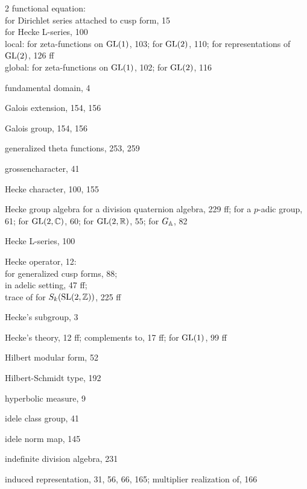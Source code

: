 \begin{multicols}{2}
\noindent functional equation:\\
\hspace*{1em}for Dirichlet series attached to cusp form, 15\\
\hspace*{1em}for Hecke L-series, 100\\
\hspace*{1em}local: for zeta-functions on $\operatorname{GL}(1)$, 103; for $\operatorname{GL}(2)$, 110; for representations of $\operatorname{GL}(2)$, 126 ff\\
\hspace*{1em}global: for zeta-functions on $\operatorname{GL}(1)$, 102; for $\operatorname{GL}(2)$, 116\par
\noindent fundamental domain, 4\par
\noindent Galois extension, 154, 156\par
\noindent Galois group, 154, 156\par
\noindent generalized theta functions, 253, 259\par
\noindent grossencharacter, 41\par
\noindent Hecke character, 100, 155\par
\noindent Hecke group algebra for a division quaternion algebra, 229 ff; for a $p$-adic group, 61; for $\operatorname{GL}(2,\mathbb{C})$, 60; for $\operatorname{GL}(2,\mathbb{R})$, 55; for $G_{\mathbb{A}}$, 82\par
\noindent Hecke L-series, 100\par
\noindent Hecke operator, 12:\\
\hspace*{1em}for generalized cusp forms, 88;\\
\hspace*{1em}in adelic setting, 47 ff;\\
\hspace*{1em}trace of for $S_k(\operatorname{SL}(2,\mathbb{Z}))$, 225 ff\par
\noindent Hecke's subgroup, 3\par
\noindent Hecke's theory, 12 ff; complements to, 17 ff; for $\operatorname{GL}(1)$, 99 ff\par
\noindent Hilbert modular form, 52\par
\noindent Hilbert-Schmidt type, 192\par
\noindent hyperbolic measure, 9\par
\noindent idele class group, 41\par
\noindent idele norm map, 145\par
\noindent indefinite division algebra, 231\par
\noindent induced representation, 31, 56, 66, 165; multiplier realization of, 166\par

\end{multicols}

